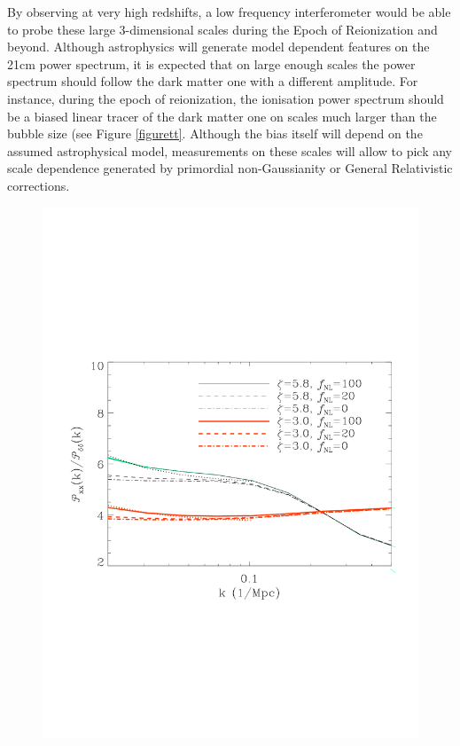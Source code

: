 \documentclass{PoS}
\begin{document}
By observing at very high redshifts, a low frequency interferometer would be able to probe these large 3-dimensional scales during the Epoch of Reionization and beyond. Although astrophysics will generate model dependent features on the 21cm power spectrum, it is expected that on large enough scales the power spectrum should follow the dark matter one with a different amplitude. For instance, during the epoch of reionization, the ionisation power spectrum should be a biased linear tracer of the dark matter one on scales much larger than the bubble size (see Figure \ref{figurett}. Although the bias itself will depend on the assumed astrophysical model, measurements on these scales will allow to pick any scale dependence generated by primordial non-Gaussianity  or General Relativistic corrections.
\begin{figure}[!t]
\includegraphics[scale=0.39]{figures/figure1_trim.pdf}

\end{figure}
\end{document}

